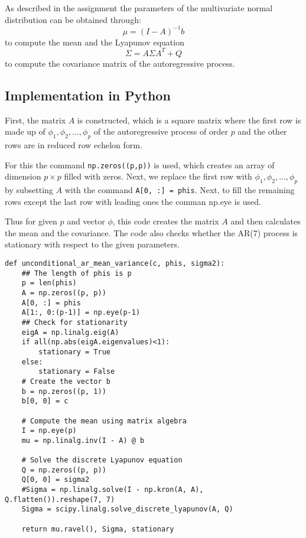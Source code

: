 \documentclass{article}
\begin{document}
As described in the assignment the parameters of the multivariate normal distribution can be obtained through:
\begin{equation}
\mu = (I - A)^{-1}b
\end{equation}
to compute the mean and the Lyapunov equation
\begin{equation}
\Sigma = A \Sigma A^T + Q
\end{equation}
to compute the covariance matrix of the autoregressive process.

\subsection{Implementation in Python}
First, the matrix $A$ is constructed, which is a square matrix where the first row is made up of $\phi_1, \phi_2, ..., \phi_p$ of the autoregressive process of order $p$ and the other rows are in reduced row echelon form.

For this the command \texttt{np.zeros((p,p))} is used, which creates an array of dimension $p \times p$ filled with zeros. 
Next, we replace the first row with $\phi_1, \phi_2, ..., \phi_p$ by subsetting $A$ with the command \texttt{A[0, :] = phis}.
Next, to fill the remaining rows except the last row with leading ones the comman np.eye is used.

Thus for given $p$ and vector $\phi$, this code creates the matrix $A$ and then calculates the mean and the covariance. 
The code also checks whether the AR(7) process is stationary with respect to the given parameters.
\begin{verbatim}
def unconditional_ar_mean_variance(c, phis, sigma2):
    ## The length of phis is p
    p = len(phis)
    A = np.zeros((p, p))
    A[0, :] = phis
    A[1:, 0:(p-1)] = np.eye(p-1)
    ## Check for stationarity
    eigA = np.linalg.eig(A)
    if all(np.abs(eigA.eigenvalues)<1):
        stationary = True
    else:
        stationary = False
    # Create the vector b
    b = np.zeros((p, 1))
    b[0, 0] = c
    
    # Compute the mean using matrix algebra
    I = np.eye(p)
    mu = np.linalg.inv(I - A) @ b
    
    # Solve the discrete Lyapunov equation
    Q = np.zeros((p, p))
    Q[0, 0] = sigma2
    #Sigma = np.linalg.solve(I - np.kron(A, A), Q.flatten()).reshape(7, 7)
    Sigma = scipy.linalg.solve_discrete_lyapunov(A, Q)
    
    return mu.ravel(), Sigma, stationary
\end{verbatim}
\end{document}

